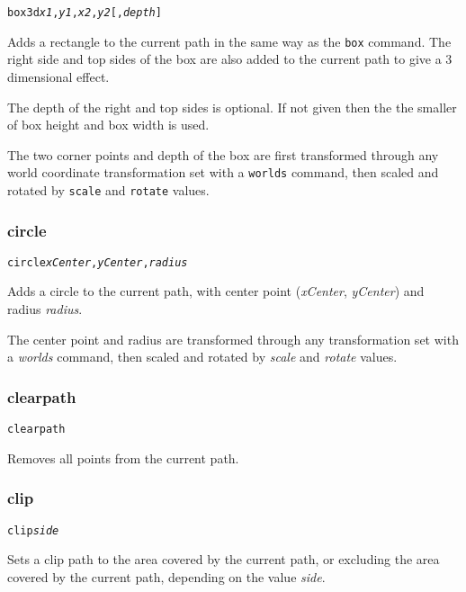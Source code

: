 \begin{alltt}
box3d \textit{x1}, \textit{y1}, \textit{x2}, \textit{y2} [, \textit{depth}]
\end{alltt}

Adds a rectangle to the current path in the same way as
the \texttt{box} command.  The right side and top sides of the
box are also added to the current path to give a 3 dimensional effect.

The depth of the right and top sides is optional.  If not given
then the the smaller of box height and box width is used.

The two corner points and depth of the box
are first transformed through any world coordinate
transformation set with a \texttt{worlds} command,
then scaled and rotated by \texttt{scale}
and \texttt{rotate} values.

\subsubsection{circle}

\begin{alltt}
circle \textit{xCenter}, \textit{yCenter}, \textit{radius}
\end{alltt}

Adds a circle to the current path, with center
point (\textit{xCenter}, \textit{yCenter}) and radius
\textit{radius}.

The center point and radius are transformed through any
transformation set with a \textit{worlds} command,
then scaled and rotated by \textit{scale}
and \textit{rotate} values.

\subsubsection{clearpath}

\begin{alltt}
clearpath
\end{alltt}

Removes all points from the current path.

\subsubsection{clip}

\begin{alltt}
clip \textit{side}
\end{alltt}

Sets a clip path to the area covered by the current path,
or excluding the area covered by the current path, depending
on the value \textit{side}.

